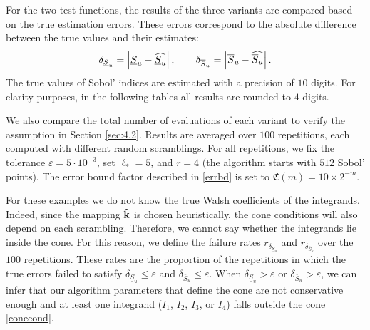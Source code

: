 For the two test functions, the results of the three variants are compared based on the true estimation errors. These errors correspond to the absolute difference between the true values and their estimates:
$$\delta_{\underline{S}_u} = \left\lvert\underline{S}_u - \widehat{\underline{S}_u}\right\rvert, \qquad \delta_{\overline{S}_u} = \left\lvert\overline{S}_u - \widehat{\overline{S}_u}\right\rvert.$$
The true values of Sobol' indices are estimated with a precision of $10$ digits. For clarity purposes, in the following tables all results are rounded to $4$ digits. 

We also compare the total number of evaluations of each variant to verify the assumption in Section \ref{sec:4.2}. Results are averaged over $100$ repetitions, each computed with different random scramblings. For all repetitions, we fix the tolerance $\varepsilon=5\cdot 10^{-3}$, set $\ell_*=5$, and $r=4$ (the algorithm starts with $512$ Sobol' points). The error bound factor described in \eqref{errbd} is set to $\mathfrak{C}(m)=10\times 2^{-m}$.

For these examples we do not know the true Walsh coefficients of the integrands. Indeed, since the mapping $\tilde{\boldsymbol{\mathbf{k}}}$ is chosen heuristically, the cone conditions will also depend on each scrambling. Therefore, we cannot say whether the integrands lie inside the cone. For this reason, we define the failure rates $r_{\delta_{\underline{S}_u}}$ and $r_{\delta_{\overline{S}_u}}$ over the $100$ repetitions. These rates are the proportion of the repetitions in which the true errors failed to satisfy $\delta_{\underline{S}_u} \leq \varepsilon$ and $\delta_{\overline{S}_u} \leq \varepsilon$. When $\delta_{\underline{S}_u} > \varepsilon$ or $\delta_{\overline{S}_u} > \varepsilon$, we can infer that our algorithm parameters that define the cone are not conservative enough and at least one integrand ($I_1$, $I_2$, $I_3$, or $I_4$) falls outside the cone \eqref{conecond}.



%

